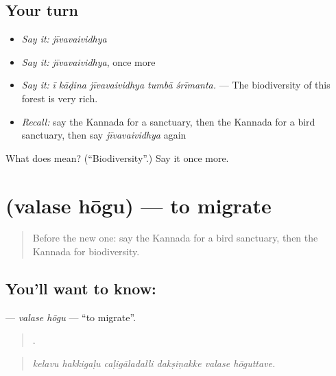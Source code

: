 \subsection*{Your turn}
\begin{itemize}
\raggedright
  \item \emph{Say it:} \emph{jīvavaividhya}
  \item \emph{Say it:} \emph{jīvavaividhya}, once more
  \item \emph{Say it:} \emph{ī kāḍina jīvavaividhya tumbā śrīmanta.} — The biodiversity of this forest is very rich.
  \item \emph{Recall:} say the Kannada for a sanctuary, then the Kannada for a bird sanctuary, then say \emph{jīvavaividhya} again
\end{itemize}

\begin{tcolorbox}[breakable,colback=teal!4,colframe=teal!35!black,title={Before you move on}]
What does  mean? (\textquotedblleft{}Biodiversity\textquotedblright{}.) Say it once more.
\end{tcolorbox}
\section[\texorpdfstring{\kn{ವಲಸೆ} \kn{ಹೋಗು} (valase hōgu)}{ವಲಸೆ ಹೋಗು (valase hōgu)}]{  (valase hōgu) — to migrate}

\label{lesson:KA-C476-valase-hogu}



\begin{quote}
Before the new one: say the Kannada for a bird sanctuary, then the Kannada for biodiversity.
\end{quote}

\subsection*{You'll want to know:  }
\textbf{ } — \emph{valase hōgu} — \textquotedblleft{}to migrate\textquotedblright{}.

\begin{quote}
     .
\end{quote}

\begin{quote}
\emph{kelavu hakkigaḷu caḷigāladalli dakṣiṇakke valase hōguttave.}
\end{quote}


